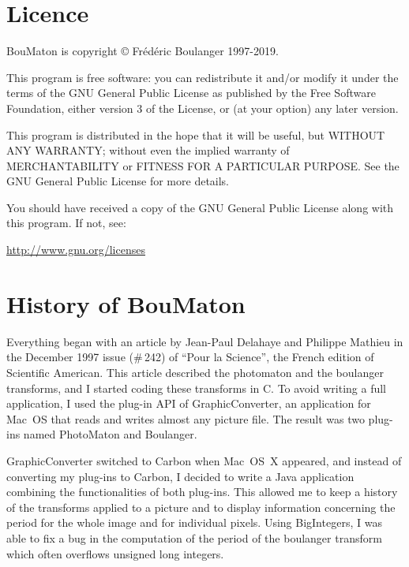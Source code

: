 \documentclass[a4paper]{article}
\newcommand{\BouMaton}{\textsf{BouMaton}\xspace}
\newcommand{\filename}[1]{\textsf{#1}}
\begin{document}
  \section{Licence}
  \newlength{\savedindent}
  \setlength{\savedindent}{\parindent}
  \setlength{\parindent}{0pt}
  \newlength{\savedskip}
  \setlength{\savedskip}{\parskip}
  \setlength{\parskip}{1ex}
  
  \BouMaton is copyright © Frédéric Boulanger 1997-2019.
  
	This program is free software: you can redistribute it and/or modify
	it under the terms of the GNU General Public License as published by
	the Free Software Foundation, either version 3 of the License, or
	(at your option) any later version.

	This program is distributed in the hope that it will be useful,
	but WITHOUT ANY WARRANTY; without even the implied warranty of
	MERCHANTABILITY or FITNESS FOR A PARTICULAR PURPOSE.  See the
	GNU General Public License for more details.

	You should have received a copy of the GNU General Public License
	along with this program.  If not, see:
  \begin{center}
  	\url{http://www.gnu.org/licenses}
  \end{center}
  
  \setlength{\parindent}{\savedindent}
  \setlength{\parskip}{\savedskip}
  
  \section{History of \BouMaton}
  Everything began with an article by Jean-Paul Delahaye and Philippe 
  Mathieu in the December 1997 issue (\#\,242) of ``Pour la Science'', the 
  French edition of Scientific American. This article described the 
  photomaton and the boulanger transforms, and I started coding these 
  transforms in C. To avoid writing a full application, I used the 
  plug-in API of GraphicConverter, an application for Mac~OS 
  that reads and writes almost any picture file. The result was two 
  plug-ins named \filename{PhotoMaton} and \filename{Boulanger}.
  
  GraphicConverter switched to Carbon when Mac~OS~X appeared, and 
  instead of converting my plug-ins to Carbon, I decided to write a 
  Java application combining the functionalities of both plug-ins. 
  This allowed me to keep a history of the transforms applied to a 
  picture and to display information concerning the period for the whole 
  image and for individual pixels. Using BigIntegers, I was able to 
  fix a bug in the computation of the period of the boulanger 
  transform which often overflows unsigned long integers.
  
\end{document}

